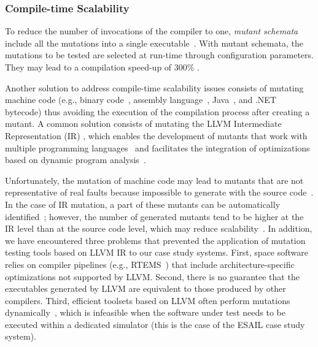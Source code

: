 %

\subsubsection{Compile-time Scalability}
\label{sec:compile:time}


To reduce the number of invocations of the compiler to one, \emph{mutant schemata} include all the mutations into a single executable~\cite{untch1993mutation}.
With mutant schemata, the mutations to be tested are selected at run-time through configuration parameters. They may lead to a compilation speed-up of 300\% \cite{papadakis2010automatic}.


Another solution to address compile-time scalability issues consists of mutating machine code  (e.g., binary code~\cite{becker2012xemu}, assembly language~\cite{crouzet2006sesame},
Java~\cite{ma2006mujava},
 and
.NET~\cite{derezinska2011object} bytecode) thus avoiding the execution of the compilation process after creating a mutant.
A common solution consists of mutating the
 LLVM Intermediate Representation (IR) \cite{hariri2016evaluating},
which enables the development of mutants that work with multiple programming languages~\cite{hariri2019comparing} and facilitates the integration of optimizations based on dynamic program analysis~\cite{denisov2018mull}.


Unfortunately, the mutation of machine code
may lead to mutants that are not representative of real faults because impossible to generate with the source code~\cite{schuler2009efficient}.
In the case of IR mutation, a part of these mutants can be automatically identified~\cite{denisov2018mull}; however,
the number of generated mutants tend to be higher at the IR level than at the source code level, which may reduce scalability~\cite{hariri2019comparing}.
 In addition, we have encountered three problems that prevented the application of
 mutation testing tools based on  LLVM IR to our case study systems.
First, space software relies on compiler pipelines (e.g., RTEMS~\cite{RTEMS}) that include architecture-specific optimizations not supported by LLVM.
Second, there is no guarantee that the executables generated by LLVM are equivalent to those produced by other compilers.
 Third, efficient toolsets based on LLVM often  perform mutations dynamically~\cite{denisov2018mull}, which is infeasible when the software under test needs to be executed within a dedicated simulator (this is the case of the ESAIL case study system).




